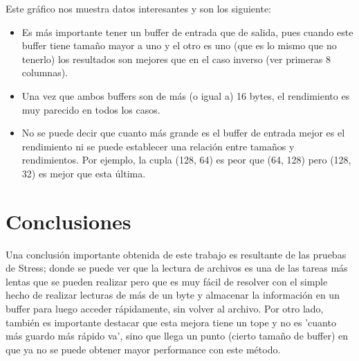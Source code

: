 \documentclass[a4paper, 10pt]{article}
\newcommand\tab[1][0.5cm]{\hspace*{#1}}
\begin{document}
    			\tab Este gráfico nos muestra datos interesantes y son los siguiente:
    			\begin{itemize}
    				\item Es más importante tener un buffer de entrada que de salida, pues cuando este buffer tiene tamaño mayor a uno y el
    				otro es uno (que es lo mismo que no tenerlo) los resultados son mejores que en el caso inverso (ver primeras 8
    				columnas).
    				\item Una vez que ambos buffers son de más (o igual a) 16 bytes, el rendimiento es muy parecido en todos los casos.
    				\item No se puede decir que cuanto más grande es el buffer de entrada mejor es el rendimiento ni se puede establecer
    				una relación entre tamaños y rendimientos. Por ejemplo, la cupla (128, 64) es peor que (64, 128) pero (128, 32) es
    				mejor que esta última.
    			\end{itemize}

	\section{Conclusiones}
		Una conclusión importante obtenida de este trabajo es resultante de las pruebas de Stress; donde se puede ver que la lectura
		de archivos es una de las tareas más lentas que se pueden realizar pero que es muy fácil de resolver con el simple hecho de 
		realizar lecturas de más de un byte y almacenar la información en un buffer para luego acceder rápidamente, sin volver al 
		archivo. Por otro lado, también es importante destacar que esta mejora tiene un tope y no es 'cuanto más guardo más rápido
		va', sino que llega un punto (cierto tamaño de buffer) en que ya no se puede obtener mayor performance con este método.
\end{document}
